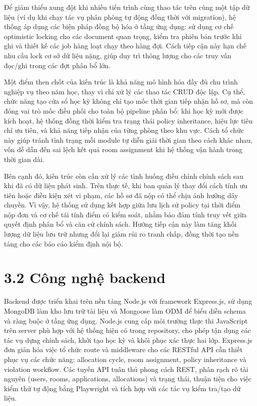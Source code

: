 \documentclass[a4paper,12pt,openany,oneside]{report}
\begin{document}
Để giảm thiểu xung đột khi nhiều tiến trình cùng thao tác trên cùng một tập dữ liệu (ví dụ khi chạy tác vụ phân phòng tự động đồng thời với migration), hệ thống áp dụng các biện pháp đồng bộ hóa ở tầng ứng dụng: sử dụng cơ chế optimistic locking cho các document quan trọng, kiểm tra phiên bản trước khi ghi và thiết kế các job hàng loạt chạy theo hàng đợi. Cách tiếp cận này hạn chế nhu cầu lock cơ sở dữ liệu nặng, giúp duy trì thông lượng cho các truy vấn đọc/ghi trong các đợt phân bổ lớn.

Một điểm then chốt của kiến trúc là khả năng mô hình hóa đầy đủ chu trình nghiệp vụ theo năm học, thay vì chỉ xử lý các thao tác CRUD độc lập. Cụ thể, chức năng tạo cửa sổ học kỳ không chỉ tạo mốc thời gian tiếp nhận hồ sơ, mà còn đóng vai trò mốc điều phối cho toàn bộ pipeline phân bổ: khi học kỳ mới được kích hoạt, hệ thống đồng thời kiểm tra trạng thái policy inheritance, hiệu lực tiêu chí ưu tiên, và khả năng tiếp nhận của từng phòng theo khu vực. Cách tổ chức này giúp tránh tình trạng mỗi module tự diễn giải thời gian theo cách khác nhau, vốn dễ dẫn đến sai lệch kết quả room assignment khi hệ thống vận hành trong thời gian dài.

Bên cạnh đó, kiến trúc còn cần xử lý các tình huống điều chỉnh chính sách sau khi đã có dữ liệu phát sinh. Trên thực tế, khi ban quản lý thay đổi cách tính ưu tiên hoặc điều kiện xét vi phạm, các hồ sơ đã nộp có thể chịu ảnh hưởng dây chuyền. Vì vậy, hệ thống sử dụng kết hợp giữa lưu lịch sử policy tại thời điểm nộp đơn và cơ chế tái tính điểm có kiểm soát, nhằm bảo đảm tính truy vết giữa quyết định phân bổ và căn cứ chính sách. Hướng tiếp cận này làm tăng khối lượng dữ liệu lưu trữ nhưng đổi lại giảm rủi ro tranh chấp, đồng thời tạo nền tảng cho các báo cáo kiểm định nội bộ.

\section*{3.2 Công nghệ backend}
Backend được triển khai trên nền tảng Node.js với framework Express.js, sử dụng MongoDB làm kho lưu trữ tài liệu và Mongoose làm ODM để biểu diễn schema và ràng buộc ở tầng ứng dụng. Node.js cung cấp môi trường thực thi JavaScript trên server phù hợp với hệ thống hiện có trong repository, cho phép tận dụng các tác vụ dựng chính sách, khởi tạo học kỳ và khôi phục xác thực hai lớp. Express.js đơn giản hóa việc tổ chức route và middleware cho các RESTful API cần thiết phục vụ các chức năng: allocation cycle, room assignment, policy inheritance và violation workflow. Các tuyến API tuân thủ phong cách REST, phân rạch rõ tài nguyên (users, rooms, applications, allocations) và trạng thái, thuận tiện cho việc kiểm thử tự động bằng Playwright và tích hợp với các tác vụ kiểm tra/tạo dữ liệu.
\end{document}

